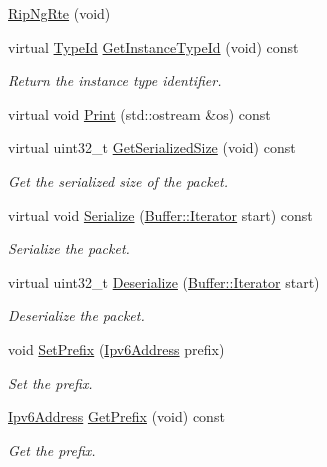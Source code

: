 \begin{DoxyCompactItemize}
\item 
\hyperlink{classns3_1_1RipNgRte_a04f04ebf452ebbd096a1632c1e067b63}{Rip\+Ng\+Rte} (void)
\item 
virtual \hyperlink{classns3_1_1TypeId}{Type\+Id} \hyperlink{classns3_1_1RipNgRte_af9100720159a36184e0990fb642ac478}{Get\+Instance\+Type\+Id} (void) const 
\begin{DoxyCompactList}\small\item\em Return the instance type identifier. \end{DoxyCompactList}\item 
virtual void \hyperlink{classns3_1_1RipNgRte_a999529aeb802c517074be14ee5ceba7a}{Print} (std\+::ostream \&os) const 
\item 
virtual uint32\+\_\+t \hyperlink{classns3_1_1RipNgRte_a897036cc454ec611284d40332b732103}{Get\+Serialized\+Size} (void) const 
\begin{DoxyCompactList}\small\item\em Get the serialized size of the packet. \end{DoxyCompactList}\item 
virtual void \hyperlink{classns3_1_1RipNgRte_ada12986eef4759b1b8e092a3a5f1e749}{Serialize} (\hyperlink{classns3_1_1Buffer_1_1Iterator}{Buffer\+::\+Iterator} start) const 
\begin{DoxyCompactList}\small\item\em Serialize the packet. \end{DoxyCompactList}\item 
virtual uint32\+\_\+t \hyperlink{classns3_1_1RipNgRte_af8ce951466606c60240d903940e2b397}{Deserialize} (\hyperlink{classns3_1_1Buffer_1_1Iterator}{Buffer\+::\+Iterator} start)
\begin{DoxyCompactList}\small\item\em Deserialize the packet. \end{DoxyCompactList}\item 
void \hyperlink{classns3_1_1RipNgRte_a405f3033dbdf82b9ac169d9894b01c5e}{Set\+Prefix} (\hyperlink{classns3_1_1Ipv6Address}{Ipv6\+Address} prefix)
\begin{DoxyCompactList}\small\item\em Set the prefix. \end{DoxyCompactList}\item 
\hyperlink{classns3_1_1Ipv6Address}{Ipv6\+Address} \hyperlink{classns3_1_1RipNgRte_afe086f342ddcfdd54594dbea8c2a3cab}{Get\+Prefix} (void) const 
\begin{DoxyCompactList}\small\item\em Get the prefix. \end{DoxyCompactList}\item 

\end{DoxyCompactItemize}
